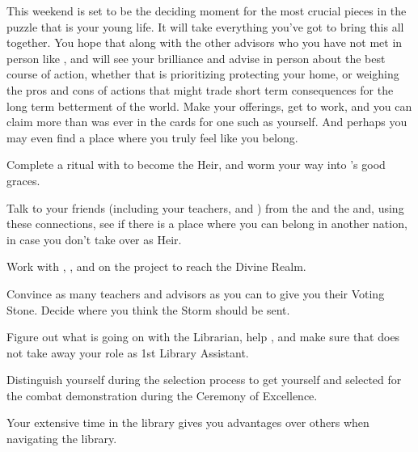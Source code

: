 \documentclass[char]{GL2020}
\begin{document}
This weekend is set to be the deciding moment for the most crucial pieces in the puzzle that is your young life. It will take everything you've got to bring this all together. You hope that \cDiplomat{} along with the other advisors who you have not met in person like \cAntiChup{}, and \cAssistantScientist{\full}will see your brilliance and advise in person about the best course of action, whether that is prioritizing protecting your home, or weighing the pros and cons of actions that might trade short term consequences for the long term betterment of the world. Make your offerings, get to work, and you can claim more than was ever in the cards for one such as yourself. And perhaps you may even find a place where you truly feel like you belong.  

\begin{itemz}
    \item Complete a ritual with \cHeir{} to become the \cHeir{\formal} Heir, and worm your way into \cDiplomat{}’s good graces.
    \item Talk to your friends (including your teachers, \cPrince{} and \cFlowPriest{}) from the \pShip{} and the \pFarm{} and, using these connections, see if there is a place where you can belong in another nation, in case you don’t take over as \cHeir{\formal} Heir.
    \item Work with \cFlowPriest{}, \cCurse{}, and \cAssistantScientist{} on the project to reach the Divine Realm.
\end{itemz}

\begin{itemz}
    \item Convince as many teachers and advisors as you can to give you their Voting Stone. Decide where you think the Storm should be sent. 
    \item Figure out what is going on with the Librarian, help \cLibrarian{\them}, and make sure that \cLibAssist{} does not take away your role as 1st Library Assistant.
    \item Distinguish yourself during the selection process to get yourself and \cChupStudent{} selected for the combat demonstration during the Ceremony of Excellence.
\end{itemz}

\begin{itemz}[Notes]
    \item Your extensive time in the library gives you advantages over others when navigating the library.
\end{itemz}
\end{document}
